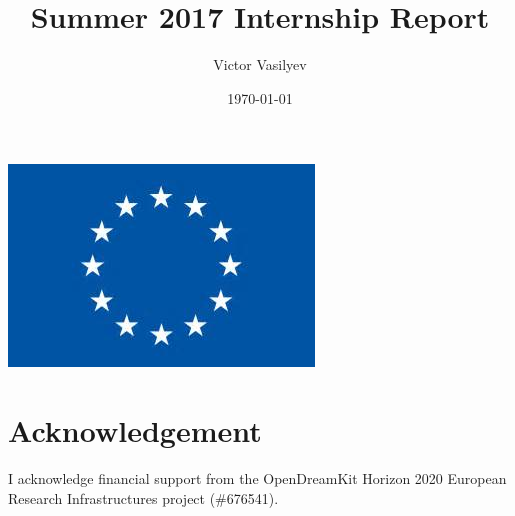 \documentclass{article}
\title{Summer 2017 Internship Report}
\author{Victor Vasilyev}
\date{\today}
\begin{document}
\maketitle

\begin{center}
  \includegraphics[scale = 0.5]{eu.jpg}
\end{center}






\section{Acknowledgement}
I acknowledge financial support from the OpenDreamKit Horizon 2020 European Research Infrastructures project (\#676541).

\printbibliography
\end{document}
